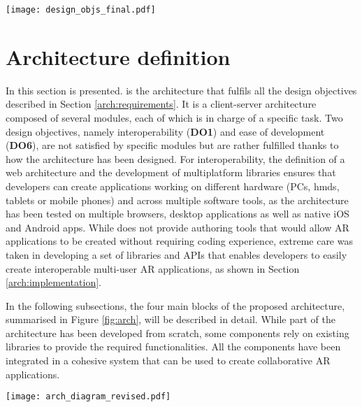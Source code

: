 \begin{figure*}[htbp]
    \centering
    \texttt{[image: design\_objs\_final.pdf]}
    \caption{\fontsize{10pt}{11pt}}
    \label{fig:desobjs}
\end{figure*}

\section{Architecture definition}\label{arch:architecture}

In this section \arch{} is presented. \arch{} is the architecture that fulfils all the design objectives described in Section \ref{arch:requirements}. It is a client-server architecture composed of several modules, each of which is in charge of a specific task. Two design objectives, namely interoperability (\textbf{DO1}) and ease of development (\textbf{DO6}), are not satisfied by specific modules but are rather fulfilled thanks to how the architecture has been designed. For interoperability, the definition of a web architecture and the development of multiplatform libraries ensures that developers can create applications working on different hardware (PCs, \glspl{hmd}, tablets or mobile phones) and across multiple software tools, as the architecture has been tested on multiple browsers, desktop applications as well as native iOS and Android apps. While \arch{} does not provide authoring tools that would allow AR applications to be created without requiring coding experience, extreme care was taken in developing a set of libraries and APIs that enables developers to easily create interoperable multi-user AR applications, as shown in Section \ref{arch:implementation}. 

In the following subsections, the four main blocks of the proposed architecture, summarised in Figure \ref{fig:arch}, will be described in detail. While part of the architecture has been developed from scratch, some components rely on existing libraries to provide the required functionalities. All the components have been integrated in a cohesive system that can be used to create collaborative AR applications.

\begin{figure*}[htbp]
    \centering
    \texttt{[image: arch\_diagram\_revised.pdf]}
    \caption{\fontsize{10pt}{11pt}}
    \label{fig:arch}
\end{figure*}


